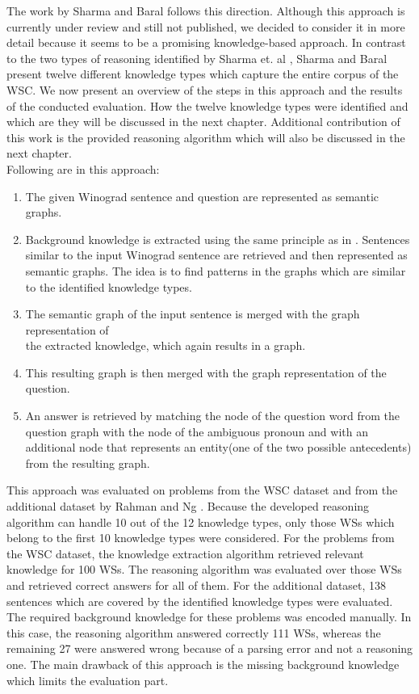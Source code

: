 The work by Sharma and Baral \cite{2018CommonsenseKT} follows this direction. Although this approach is currently under review and still not published, we decided to consider it in more detail because it seems to be a promising knowledge-based approach. In contrast to the two types of reasoning identified by Sharma et. al \cite{DBLP:conf/ijcai/SharmaVAB15}, Sharma and Baral \cite{2018CommonsenseKT} present twelve different knowledge types which capture the entire corpus of the WSC. We now present an overview of the steps in this approach and the results of the conducted evaluation. How the twelve knowledge types were identified and which are they will be discussed in the next chapter. Additional contribution of this work is the provided reasoning algorithm which will also be discussed in the next chapter. 
 \\ Following are  in this approach: 
\begin{enumerate}
	\item The given Winograd sentence and question are represented as semantic graphs.
	\item Background knowledge is extracted using the same principle as in \cite{DBLP:conf/ijcai/SharmaVAB15}. Sentences similar to the input Winograd sentence are retrieved and then represented as semantic graphs. The idea is to find patterns in the graphs which are similar to the identified knowledge types. 
	\item The semantic graph of the input sentence is merged with the graph representation of \\
	 the extracted knowledge, which again results in a graph.
	\item This resulting graph is then merged with the graph representation of the question.
	\item An answer is retrieved by matching the node of the question word from the question graph with the node of the ambiguous pronoun and with an additional node that represents an entity(one of the two possible antecedents) from the resulting graph. 
\end{enumerate}

This approach was evaluated on problems from the WSC dataset and from the additional dataset by Rahman and Ng \cite{DBLP:conf/emnlp/RahmanN12}. Because the developed reasoning algorithm can handle 10 out of the 12 knowledge types, only those WSs which belong to the first 10 knowledge types were considered. For the problems from the WSC dataset, the knowledge extraction algorithm retrieved relevant knowledge for 100 WSs. The reasoning algorithm was evaluated over those WSs and retrieved correct answers for all of them.  
For the additional dataset, 138 sentences which are covered by the identified knowledge types were evaluated. The required background knowledge for these problems was encoded manually. In this case, the reasoning algorithm answered correctly 111 WSs, whereas the remaining 27 were answered wrong because of a parsing error and not a reasoning one. The main drawback of this approach is the missing background knowledge which limits the evaluation part. 
 
